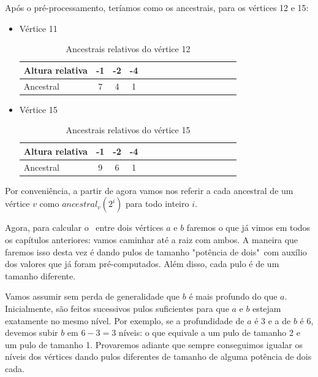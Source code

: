 Após o pré-processamento, teríamos como os ancestrais, para os vértices 12 e 15:

\begin{itemize}
    \item Vértice 11

    \begin{table}[htb]
    \centering
    \begin{tabular}{|l|c|c|c|c|c|c|c|c|c|c|c|c|c|c|}
    \hline
    Altura relativa & -1 & -2 & -4 \\ \hline
    Ancestral       & 7 & 4  & 1 \\ \hline
    \end{tabular}
    \caption{Ancestrais relativos do vértice 12}
    \end{table}
    
    \item Vértice 15
    
    \begin{table}[htb]
    \centering
    \begin{tabular}{|l|c|c|c|c|c|c|c|c|c|c|c|c|c|c|}
    \hline
    Altura relativa & -1 & -2 & -4 \\ \hline
    Ancestral       & 9  & 6  & 1 \\ \hline
    \end{tabular}
    \caption{Ancestrais relativos do vértice 15}
    \end{table}

\end{itemize}

Por conveniência, a partir de agora vamos nos referir a cada ancestral de um vértice $v$ como $ancestral_v(2^i)$ para todo inteiro $i$.

Agora, para calcular o \LCA\ entre dois vértices $a$ e $b$ faremos o que já vimos em todos os capítulos anteriores: vamos caminhar até a raiz com ambos. A maneira que faremos isso desta vez é dando pulos de tamanho "potência de dois"\  com auxílio dos valores que já foram pré-computados. Além disso, cada pulo é de um tamanho diferente.

Vamos assumir sem perda de generalidade que $b$ é mais profundo do que $a$. Inicialmente, são feitos sucessivos pulos suficientes para que $a$ e $b$ estejam exatamente no mesmo nível. Por exemplo, se a profundidade de $a$ é 3 e a de $b$ é 6, devemos subir $b$ em $6 - 3 = 3$ níveis: o que equivale a um pulo de tamanho 2 e um pulo de tamanho 1. Provaremos adiante que sempre conseguimos igualar os níveis dos vértices dando pulos diferentes de tamanho de alguma potência de dois cada.

